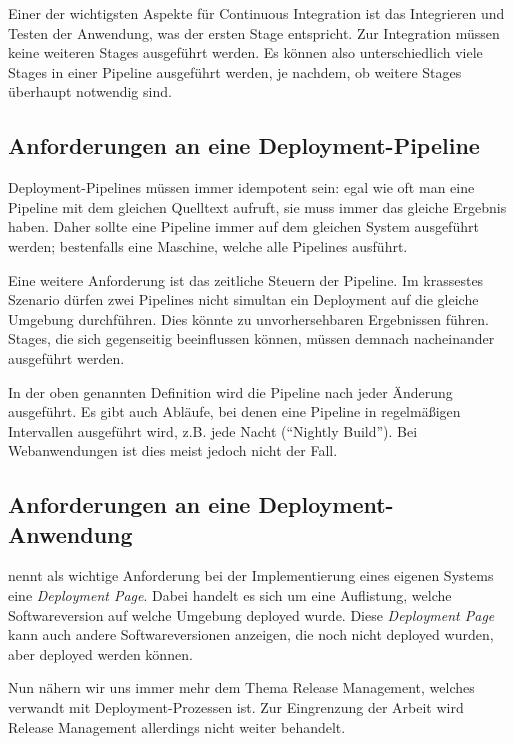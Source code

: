 Einer der wichtigsten Aspekte für Continuous Integration ist das Integrieren und Testen der Anwendung, was der ersten Stage entspricht. Zur Integration müssen keine weiteren Stages ausgeführt werden. Es können also unterschiedlich viele Stages in einer Pipeline ausgeführt werden, je nachdem, ob weitere Stages überhaupt notwendig sind.

\subsection{Anforderungen an eine Deployment-Pipeline}

Deployment-Pipelines müssen immer idempotent sein: egal wie oft man eine Pipeline mit dem gleichen Quelltext aufruft, sie muss immer das gleiche Ergebnis haben. Daher sollte eine Pipeline immer auf dem gleichen System ausgeführt werden; bestenfalls eine Maschine, welche alle Pipelines ausführt. \citep[155]{Humble2010}

Eine weitere Anforderung ist das zeitliche Steuern der Pipeline. Im krassestes Szenario dürfen zwei Pipelines nicht simultan ein Deployment auf die gleiche Umgebung durchführen. Dies könnte zu unvorhersehbaren Ergebnissen führen. Stages, die sich gegenseitig beeinflussen können, müssen demnach nacheinander ausgeführt werden. \citep[119]{Humble2010}

In der oben genannten Definition wird die Pipeline nach jeder Änderung ausgeführt. Es gibt auch Abläufe, bei denen eine Pipeline in regelmäßigen Intervallen ausgeführt wird, z.B. jede Nacht (``Nightly Build''). Bei Webanwendungen ist dies meist jedoch nicht der Fall.

\subsection{Anforderungen an eine Deployment-Anwendung}

\citet[127]{Humble2010} nennt als wichtige Anforderung bei der Implementierung eines eigenen Systems eine \emph{Deployment Page}. Dabei handelt es sich um eine Auflistung, welche Softwareversion auf welche Umgebung deployed wurde. Diese \emph{Deployment Page} kann auch andere Softwareversionen anzeigen, die noch nicht deployed wurden, aber deployed werden können.

Nun nähern wir uns immer mehr dem Thema Release Management, welches verwandt mit Deployment-Prozessen ist. Zur Eingrenzung der Arbeit wird Release Management allerdings nicht weiter behandelt.
